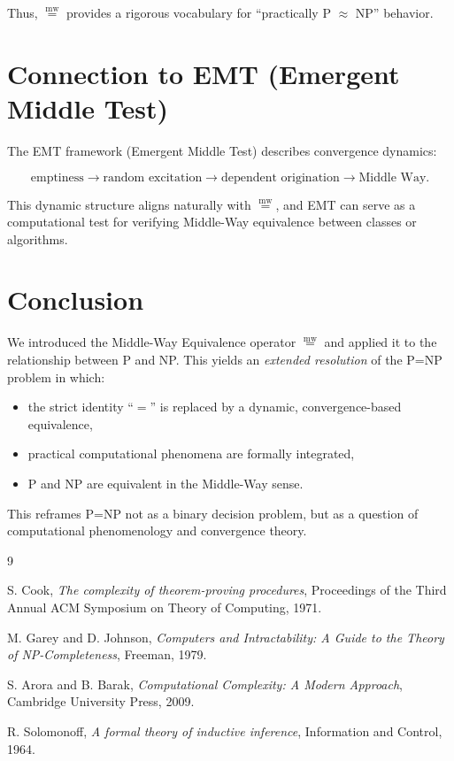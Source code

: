 \documentclass[12pt]{article}
\newcommand{\mweq}{\mathrel{\overset{\mathrm{mw}}{=}}}
\begin{document}
Thus, $\mweq$ provides a rigorous vocabulary for ``practically P $\approx$ NP'' behavior.

\section{Connection to EMT (Emergent Middle Test)}

The EMT framework (Emergent Middle Test) describes convergence dynamics:

\[
\text{emptiness} \rightarrow \text{random excitation} 
\rightarrow \text{dependent origination} \rightarrow \text{Middle Way}.
\]

This dynamic structure aligns naturally with $\mweq$,
and EMT can serve as a computational test for verifying Middle-Way equivalence 
between classes or algorithms.

\section{Conclusion}

We introduced the Middle-Way Equivalence operator $\mweq$ and applied it to the
relationship between P and NP.  
This yields an \emph{extended resolution} of the P=NP problem in which:

\begin{itemize}
    \item the strict identity ``$=$'' is replaced by a dynamic, convergence-based equivalence,
    \item practical computational phenomena are formally integrated,
    \item P and NP are equivalent in the Middle-Way sense.
\end{itemize}

This reframes P=NP not as a binary decision problem, but as a question of 
computational phenomenology and convergence theory.

\begin{thebibliography}{9}

S. Cook,
\emph{The complexity of theorem-proving procedures},
Proceedings of the Third Annual ACM Symposium on Theory of Computing, 1971.

M. Garey and D. Johnson,
\emph{Computers and Intractability: A Guide to the Theory of NP-Completeness},
Freeman, 1979.

S. Arora and B. Barak,
\emph{Computational Complexity: A Modern Approach},
Cambridge University Press, 2009.

R. Solomonoff,
\emph{A formal theory of inductive inference},
Information and Control, 1964.

\end{thebibliography}
\end{document}
